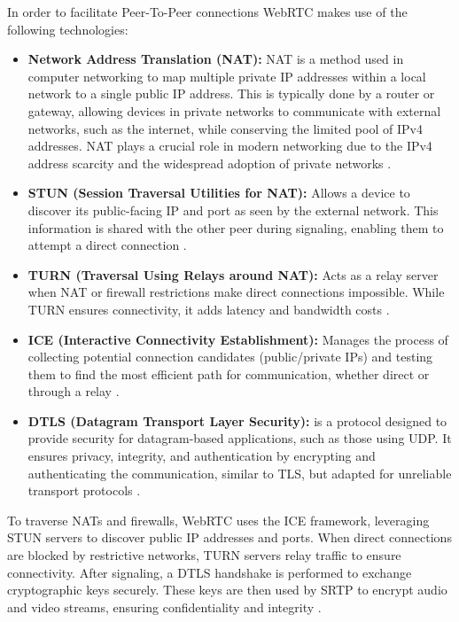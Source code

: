 \documentclass[conference]{IEEEtran}
\begin{document}
In order to facilitate Peer-To-Peer connections WebRTC makes use of the following technologies:
\begin{itemize}
    \item \textbf{Network Address Translation (NAT):} NAT is a method used in computer networking to map multiple private IP addresses within a local network 
    to a single public IP address. This is typically done by a router or gateway, allowing devices in private networks to communicate with 
    external networks, such as the internet, while conserving the limited pool of IPv4 addresses. NAT plays a crucial role in modern 
    networking due to the IPv4 address scarcity and the widespread adoption of private networks \cite{RFC2663}. 
    \item \textbf{STUN (Session Traversal Utilities for NAT):} Allows a device to discover its public-facing IP and port as seen by the external 
    network. This information is shared with the other peer during signaling, enabling them to attempt a direct connection \cite{RFC2663}. 
    \item \textbf{TURN (Traversal Using Relays around NAT):} Acts as a relay server when NAT or firewall restrictions make direct connections impossible. 
    While TURN ensures connectivity, it adds latency and bandwidth costs \cite{RFC2663}.
    \item \textbf{ICE (Interactive Connectivity Establishment):} Manages the process of collecting potential connection candidates (public/private IPs) and testing
     them to find the most efficient path for communication, whether direct or through a relay \cite{W3C_WebRTC}.
    \item \textbf{DTLS (Datagram Transport Layer Security):} is a protocol designed to provide security for datagram-based applications, such as those using UDP.
     It ensures privacy, integrity, and authentication by encrypting and authenticating the communication, similar to TLS, but adapted for unreliable transport protocols \cite{RFC5764}.
\end{itemize}

To traverse NATs and firewalls, WebRTC uses the ICE framework, leveraging STUN servers to discover public IP addresses and ports. 
When direct connections are blocked by restrictive networks, TURN servers relay traffic to ensure connectivity. After signaling, a
DTLS handshake is performed to exchange cryptographic keys securely. These keys are then used by SRTP to encrypt audio and video streams, 
ensuring confidentiality and integrity \cite{W3C_WebRTC}.
\end{document}
